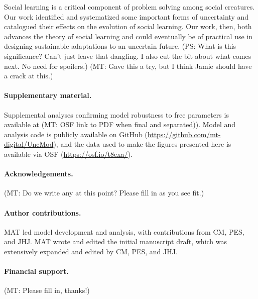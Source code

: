 \documentclass[letterpaper,11.5pt]{scrartcl}
\newcommand{\mt}[1]{{\textcolor{myorange} {({\tiny MT:} #1)}}}
\newcommand{\ps}[1]{{\textcolor{mygreen} {({\tiny PS:} #1)}}}
\begin{document}
Social learning is a critical component of problem solving among social creatures.
Our work identified and systematized some important forms of uncertainty and catalogued their effects on 
the evolution of social learning. Our work, then, both advances the theory of social
learning and could eventually be of practical use in designing sustainable
adaptations to an uncertain future.
\ps{What is this significance? Can't just leave that dangling. I also cut the bit about what comes next. No need for spoilers.} \mt{Gave this a try, but I think Jamie should have a crack at this.}

\paragraph{Supplementary material.} Supplemental analyses confirming model robustness to free parameters is available at \mt{OSF link to PDF when final and separated)}. Model and analysis code is publicly available on GitHub (\url{https://github.com/mt-digital/UncMod}), and the data used to make the figures presented here is available via OSF (\url{https://osf.io/t8exa/}).

\paragraph{Acknowledgements.} \mt{Do we write any at this point? Please fill in as you see fit.}

\paragraph{Author contributions.} MAT led model development and analysis, with contributions from CM, PES, and JHJ. MAT wrote and edited the initial manuscript draft, which was extensively expanded and edited by CM, PES, and JHJ.

\paragraph{Financial support.} \mt{Please fill in, thanks!}
\end{document}

